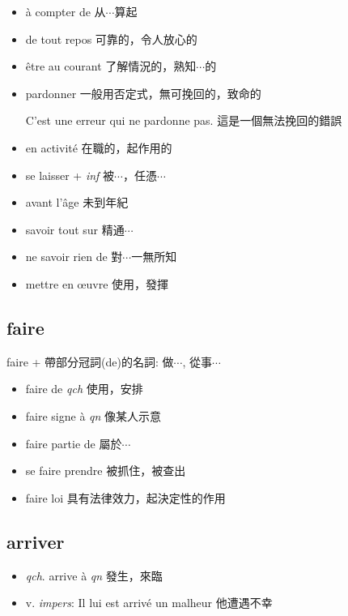 \documentclass{book}
\begin{document}
\begin{itemize}
            \item à compter de 从$\cdots$算起
            \item de tout repos 可靠的，令人放心的
            \item être au courant 了解情況的，熟知$\cdots$的
            \item pardonner 一般用否定式，無可挽回的，致命的
                \begin{center}
                    C'est une erreur qui ne pardonne pas. 這是一個無法挽回的錯誤
                \end{center}
            \item en activité 在職的，起作用的
            \item se laisser + \textit{inf} 被$\cdots$，任憑$\cdots$
            \item avant l'âge 未到年紀
            \item savoir tout sur 精通$\cdots$
            \item ne savoir rien de 對$\cdots$一無所知
            \item mettre en œuvre 使用，發揮
        \end{itemize}

        \subsection{faire}
            faire + 帶部分冠詞(de)的名詞: 做$\cdots$, 從事$\cdots$
            \begin{itemize}
                \item faire de \textit{qch} 使用，安排
                \item faire signe à \textit{qn} 像某人示意
                \item faire partie de 屬於$\cdots$
                \item se faire prendre 被抓住，被查出
                \item faire loi 具有法律效力，起決定性的作用
            \end{itemize}

        \subsection{arriver}
            \begin{itemize}
                \item \textit{qch}. arrive à \textit{qn} 發生，來臨
                \item v. \textit{impers}: Il lui est arrivé un malheur 他遭遇不幸
            \end{itemize}
\end{document}
